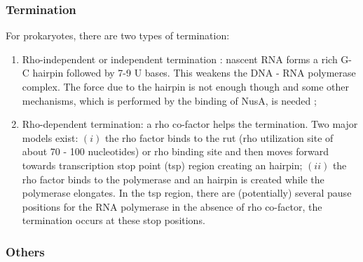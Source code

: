 \subsubsection{Termination}
For prokaryotes, there are two types of termination:
\begin{enumerate}
  \item Rho-independent or independent termination \citep{GuN:99,WaG:10}: nascent RNA forms a rich G-C hairpin followed by 7-9 U bases. This weakens the DNA - RNA polymerase complex. The force due to the hairpin is not enough though and some other mechanisms, which is performed by the binding of NusA, is needed \citep{HeB:08};
  \item Rho-dependent termination: a rho co-factor helps the termination. Two major models exist: $(i)$ the rho factor binds to the rut (rho utilization site of about 70 - 100 nucleotides) or rho binding site and then moves forward towards transcription stop point (tsp) region creating an hairpin; $(ii)$ the rho factor binds to the polymerase \citep{EDWN:10} and an hairpin is created while the polymerase elongates. In the tsp region, there are (potentially) several pause positions for the RNA polymerase in the absence of rho co-factor, the termination occurs at these stop positions.
\end{enumerate}





\subsubsection{Others}

